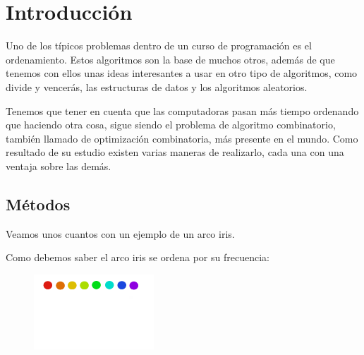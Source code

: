 \documentclass[12pt, fleqn]{report}                             %
\theoremstyle{break}                                            %
\begin{document}
\restoregeometry                                                    %
\nopagecolor                                                        %




\tableofcontents{}
\label{sec:Index}

\clearpage

	
	\section{Introducción}
    	Uno de los típicos problemas dentro de un curso de programación es el ordenamiento. Estos algoritmos son la base de muchos otros, además de que tenemos con ellos unas ideas interesantes a usar en otro tipo de algoritmos, como divide y vencerás, las estructuras de datos y los algoritmos aleatorios.
    	
    	
    	Tenemos que tener en cuenta que las computadoras pasan más tiempo ordenando que haciendo otra cosa, sigue siendo el problema de algoritmo combinatorio, también llamado de optimización combinatoria, más presente en el mundo. Como resultado de su estudio existen varias maneras de realizarlo, cada una con una ventaja sobre las demás.
    	
    	\subsection{Métodos}
    	Veamos unos cuantos con un ejemplo de un arco iris.
    	
    	Como debemos saber el arco iris se ordena por su frecuencia:
    	\begin{figure}[h]
                        \centering
                        \includegraphics[width=0.4\textwidth]{graphics/Ordenados.png}
                    \end{figure}
                    
\end{document}
